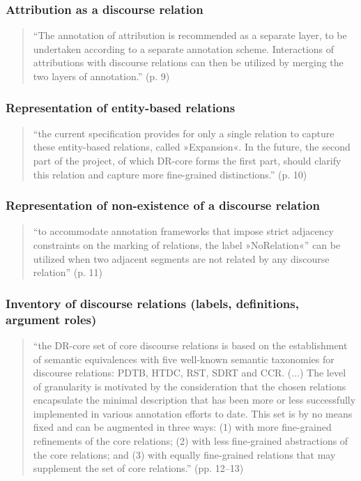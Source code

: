 \documentclass{udisc}
\begin{document}
\begin{itemize}
\subsubsection{Attribution as a discourse relation}

\begin{quote}
“The annotation of attribution is recommended as a separate layer, to be undertaken according to a separate annotation scheme. Interactions of attributions with discourse relations can then be utilized by merging the two layers of annotation.” (p. 9)
\end{quote}

\subsubsection{Representation of entity-based relations}

\begin{quote}
“the current specification provides for only a single relation to capture these entity-based relations, called »Expansion«. In the future, the second part of the project, of which DR-core forms the first part, should clarify this relation and capture more fine-grained distinctions.” (p. 10)
\end{quote}

\subsubsection{Representation of non-existence of a discourse relation}

\begin{quote}
“to accommodate annotation frameworks that impose strict adjacency constraints on the marking of relations, the label »NoRelation«” can be utilized when two adjacent segments are not related by any discourse relation” (p. 11)
\end{quote}

\subsubsection{Inventory of discourse relations (labels, definitions, argument roles)}

\begin{quote}
“the DR-core set of core discourse relations is based on the establishment of semantic equivalences with five well-known semantic taxonomies for discourse relations: PDTB, HTDC, RST, SDRT and CCR. (...) The level of granularity is motivated by the consideration that the chosen relations encapsulate the minimal description that has been more or less successfully implemented in various annotation efforts to date. This set is by no means fixed and can be augmented in three ways: (1) with more fine-grained refinements of the core relations; (2) with less fine-grained abstractions of the core relations; and (3) with equally fine-grained relations that may supplement the set of core relations.” (pp. 12–13)
\end{quote}



\end{itemize}
\end{document}
